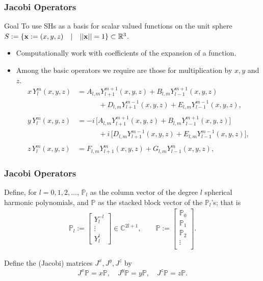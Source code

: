 \documentclass[10pt]{beamer}
\newcommand{\R}{\mathbb{R}}
\newcommand{\C}{\mathbb{C}}
\newcommand{\Ylm}{Y^m_l}
\newcommand{\Alm}{A_{l,m}}
\newcommand{\Blm}{B_{l,m}}
\newcommand{\Dlm}{D_{l,m}}
\newcommand{\Elm}{E_{l,m}}
\newcommand{\Flm}{F_{l,m}}
\newcommand{\Glm}{G_{l,m}}
\newcommand{\bigP}{\mathbb{P}}
\newcommand{\Pl}{\mathbb{P}_l}
\begin{document}
\frame
{
    \frametitle{Jacobi Operators}

\begin{block}{Goal}
To use SHs as a basis for scalar valued functions on the unit sphere $S := \{ \bold{x} := (x,y,z) \quad | \quad ||\bold{x}|| = 1\} \subset \R^3$.
\end{block} 

\begin{itemize}

\item Computationally work with coefficients of the expansion of a function.

\item Among the basic operators we require are those for multiplication by $x, y$ and $z$.
\begin{align}
x\,\Ylm(x,y,z) &= \Alm Y^{m+1}_{l+1}(x,y,z) +  \Blm Y^{m+1}_{l-1}(x,y,z) \nonumber \\
		     & \quad \quad \quad + \Dlm Y^{m-1}_{l+1}(x,y,z) + \Elm Y^{m-1}_{l-1}(x,y,z), \\ \nonumber \\
y\,\Ylm(x,y,z) &= - i \, \big[\Alm Y^{m+1}_{l+1}(x,y,z) +  \Blm Y^{m+1}_{l-1}(x,y,z) \big] \nonumber \\
		     &\quad \quad \quad + i \, \big[ \Dlm Y^{m-1}_{l+1}(x,y,z) + \Elm Y^{m-1}_{l-1}(x,y,z) \big], \\ \nonumber \\
z\,\Ylm(x,y,z) &= \Flm Y^{m}_{l+1}(x,y,z) + \Glm Y^{m}_{l-1}(x,y,z) ,
\end{align}

\end{itemize}

}

\frame
{
    \frametitle{Jacobi Operators}

Define, for \(l = 0, 1, 2, \dots\), \(\Pl\) as the column vector of the degree \(l\) spherical harmonic polynomials, and \(\bigP\) as the stacked block vector of the \(\Pl\)'s; that is
\begin{align}
\Pl := \begin{bmatrix}
		Y^{-l}_l \\
		\vdots \\
		Y^l_l
	\end{bmatrix} \in \C^{2l+1}, 
\quad \quad 
\bigP := \begin{bmatrix}
		\bigP_0 \\
		\hline
		\bigP_1 \\
		\hline
		\bigP_2 \\
		\vdots \\
	\end{bmatrix}.
\end{align}

Define the (Jacobi) matrices \(J^x, J^y, J^z\) by 
\begin{align}
J^x \bigP = x \bigP, \quad J^y \bigP = y \bigP, \quad J^z \bigP = z \bigP.
\end{align}

}
\end{document}
